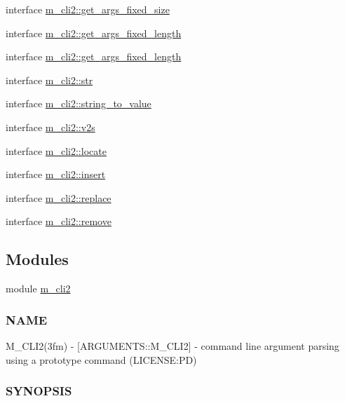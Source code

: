 \begin{DoxyCompactItemize}
\item 
interface \mbox{\hyperlink{interfacem__cli2_1_1get__args__fixed__size}{m\+\_\+cli2\+::get\+\_\+args\+\_\+fixed\+\_\+size}}
\item 
interface \mbox{\hyperlink{interfacem__cli2_1_1get__args__fixed__length}{m\+\_\+cli2\+::get\+\_\+args\+\_\+fixed\+\_\+length}}
\item 
interface \mbox{\hyperlink{interfacem__cli2_1_1get__args__fixed__length}{m\+\_\+cli2\+::get\+\_\+args\+\_\+fixed\+\_\+length}}
\item 
interface \mbox{\hyperlink{interfacem__cli2_1_1str}{m\+\_\+cli2\+::str}}
\item 
interface \mbox{\hyperlink{interfacem__cli2_1_1string__to__value}{m\+\_\+cli2\+::string\+\_\+to\+\_\+value}}
\item 
interface \mbox{\hyperlink{interfacem__cli2_1_1v2s}{m\+\_\+cli2\+::v2s}}
\item 
interface \mbox{\hyperlink{interfacem__cli2_1_1locate}{m\+\_\+cli2\+::locate}}
\item 
interface \mbox{\hyperlink{interfacem__cli2_1_1insert}{m\+\_\+cli2\+::insert}}
\item 
interface \mbox{\hyperlink{interfacem__cli2_1_1replace}{m\+\_\+cli2\+::replace}}
\item 
interface \mbox{\hyperlink{interfacem__cli2_1_1remove}{m\+\_\+cli2\+::remove}}
\end{DoxyCompactItemize}
\subsection*{Modules}
\begin{DoxyCompactItemize}
\item 
module \mbox{\hyperlink{namespacem__cli2}{m\+\_\+cli2}}
\begin{DoxyCompactList}\small\item\em \subsubsection*{N\+A\+ME}

M\+\_\+\+C\+L\+I2(3fm) -\/ \mbox{[}A\+R\+G\+U\+M\+E\+N\+T\+S\+::\+M\+\_\+\+C\+L\+I2\mbox{]} -\/ command line argument parsing using a prototype command (L\+I\+C\+E\+N\+SE\+:PD) \subsubsection*{S\+Y\+N\+O\+P\+S\+IS}\end{DoxyCompactList}\end{DoxyCompactItemize}
